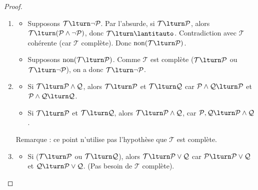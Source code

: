 \documentclass[11pt,class=report,crop=false]{standalone}
\begin{document}
\begin{proof}
	~
	\begin{enumerate}
		\item 
		\begin{itemize}
			\item Supposons $\mathcal{T} \lturn \lnot \mathcal{P}$.
			Par l'absurde, si $\mathcal{T} \lturn \mathcal{P}$, alors $\mathcal{T} \lturn (\mathcal{P} \land \lnot \mathcal{P})$, donc $\mathcal{T} \lturn \lantitauto$. Contradiction avec $\mathcal{T}$ cohérente (car $\mathcal{T}$ complète).
			Donc $\text{non}(\mathcal{T} \lturn \mathcal{P})$.
			
			\item Supposons $\text{non}(\mathcal{T} \lturn \mathcal{P})$.
			Comme $\mathcal{T}$ est complète ($\mathcal{T} \lturn \mathcal{P}$ ou $\mathcal{T} \lturn \lnot \mathcal{P}$), on a donc $\mathcal{T} \lturn \lnot \mathcal{P}$.
		\end{itemize}
		
		\item 
		\begin{itemize}
			\item Si $\mathcal{T} \lturn \mathcal{P} \land \mathcal{Q}$, alors $\mathcal{T} \lturn \mathcal{P}$ et $\mathcal{T} \lturn \mathcal{Q}$ car $\mathcal{P} \land \mathcal{Q} \lturn \mathcal{P}$ et $\mathcal{P} \land \mathcal{Q} \lturn \mathcal{Q}$.
			\item Si $\mathcal{T} \lturn \mathcal{P}$ et $\mathcal{T} \lturn \mathcal{Q}$, alors $\mathcal{T} \lturn \mathcal{P} \land \mathcal{Q}$, car $\mathcal{P}, \mathcal{Q} \lturn \mathcal{P} \land \mathcal{Q}$.
		\end{itemize}
		Remarque : ce point n'utilise pas l'hypothèse que $\mathcal{T}$ est complète.
		
		\item 
		\begin{itemize}
			\item Si ($\mathcal{T} \lturn \mathcal{P}$ ou $\mathcal{T} \lturn \mathcal{Q}$), alors $\mathcal{T} \lturn \mathcal{P} \lor \mathcal{Q}$ car $\mathcal{P} \lturn \mathcal{P} \lor \mathcal{Q}$ et $\mathcal{Q} \lturn \mathcal{P} \lor \mathcal{Q}$. (Pas besoin de $\mathcal{T}$ complète).
			

\end{itemize}
\end{enumerate}
\end{proof}
\end{document}
